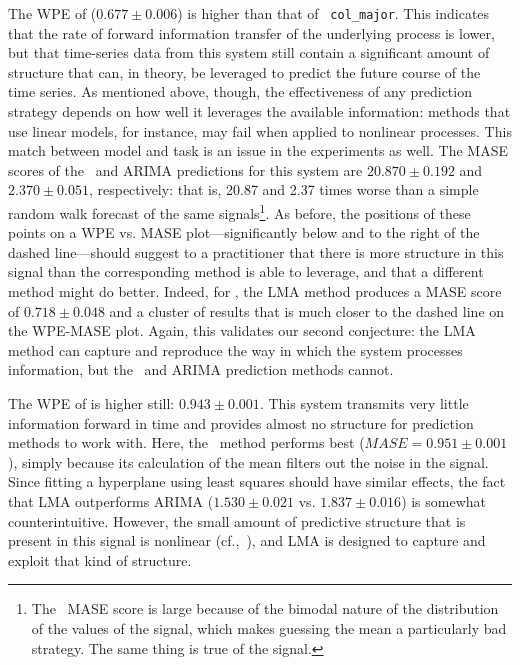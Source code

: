 The WPE of \svdfive ($0.677 \pm 0.006$) is higher than that of {\tt
  col\_major}.  This indicates that the rate of forward information
transfer of the underlying process is lower, but that time-series data
from this system still contain a significant amount of structure that
can, in theory, be leveraged to predict the future course of the time
series.  As mentioned above, though, the effectiveness of any
prediction strategy depends on how well it leverages the available
information: methods that use linear models, for instance, may fail
when applied to nonlinear processes.
%
%
This match between model and task is an issue in the \svdfive
experiments as well.  The MASE scores of the \naive ~and ARIMA
predictions for this system are $20.870 \pm 0.192$ and $2.370 \pm
0.051$, respectively: that is, 20.87 and 2.37 times worse than a
simple random walk forecast of the same signals\footnote{The \naive
  ~MASE score is large because of the bimodal nature of the
  distribution of the values of the signal, which makes guessing the
  mean a particularly bad strategy.  The same thing is true of the
  \svdthree signal.}.  As before, the positions of these points on a
WPE vs. MASE plot---significantly below and to the right of the
dashed line---should suggest to a practitioner that there is more
structure in this signal than the corresponding method is able to
leverage, and that a different method might do better.  Indeed, for
\svdfive, the LMA method produces a MASE score of $ 0.718\pm 0.048 $
and a cluster of results that is much closer to the dashed line on the
WPE-MASE plot.  Again, this validates our second conjecture: the LMA
method can capture and reproduce the way in which the \svdfive system
processes information, but the \naive ~and ARIMA prediction methods
cannot.

The WPE of \gcc is higher still: $0.943 \pm 0.001$.  This system
transmits very little information forward in time and provides almost
no structure for prediction methods to work with.  Here, the \naive
~method performs best ($MASE=0.951 \pm 0.001$), simply because its
calculation of the mean filters out the noise in the signal.  Since
fitting a hyperplane using least squares should have similar effects,
the fact that LMA outperforms ARIMA ($1.530 \pm 0.021$ vs. $1.837 \pm
0.016$) is somewhat counterintuitive.  However, the small amount of
predictive structure that is present in this signal is nonlinear
(cf.,~\cite{mytkowicz09}), and LMA is designed to capture and exploit
that kind of structure.

